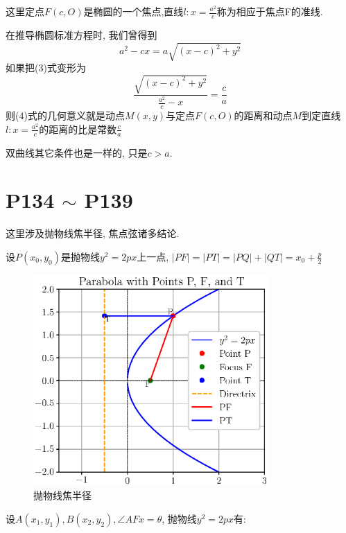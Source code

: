 \documentclass{book}
\begin{document}
    这里定点$F(c,O)$是椭圆的一个焦点,直线$\displaystyle l:x=\frac{a^2}{c}$称为相应于焦点F的准线.

    在推导椭圆标准方程时, 我们曾得到
    \begin{equation}
        a^2-cx=a\sqrt{(x-c)^2+y^2}
    \end{equation}
    如果把(3)式变形为
    \begin{equation}
        \frac{\sqrt{\left( x-c \right)^2+y^2}}{\displaystyle \frac{a^2}{c}-x}=\frac{c}{a}
    \end{equation}
    则(4)式的几何意义就是动点$M(x,y)$与定点$F(c,O)$的距离和动点$M$到定直线$\displaystyle l:x=\frac{a^2}{c}$的距离的比是常数$\displaystyle \frac{c}{a}$

    双曲线其它条件也是一样的, 只是$c>a$.

    \section{\textcolor[rgb]{0.11,0.65,0.52}{P134 $\sim$ P139}}

    这里涉及抛物线\textcolor[rgb]{0.38,0.11,0.2}{焦半径, 焦点弦}诸多结论.

    设$P\left( x_0,y_0 \right)$是抛物线$y^2=2px$上一点, $\displaystyle \left| PF \right|=\left| PT \right|=\left| PQ \right|+\left| QT \right|=x_0+\frac{p}{2}$
    \begin{figure}[htbp]
        \centering
        \includegraphics[width=0.8\textwidth]{img/ParabolaFocusRadius.eps}
        \caption{抛物线焦半径}
    \end{figure}

    设$A(x_1,y_1),B(x_2,y_2),\angle AFx=\theta$, 抛物线$y^2=2px$有:
\end{document}
